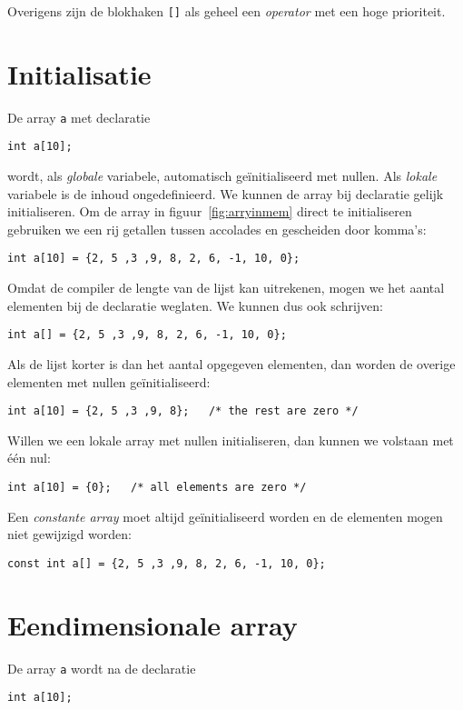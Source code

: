 Overigens zijn de blokhaken \texttt{[]} als geheel een \textsl{operator}\indexop{[]} met een hoge prioriteit.

\section{Initialisatie}
De array \texttt{a} met declaratie

\hspace*{1em}\texttt{int a[10];}

wordt, als \textsl{globale} variabele, automatisch geïnitialiseerd met nullen. Als \textsl{lokale} variabele is de inhoud ongedefinieerd.
We kunnen de array bij declaratie gelijk initialiseren. Om de array in figuur~\ref{fig:arryinmem} direct te initialiseren gebruiken we een rij getallen tussen accolades en gescheiden door komma's:

\hspace*{1em}\texttt{int a[10] = \{2, 5 ,3 ,9, 8, 2, 6, -1, 10, 0\};}

Omdat de compiler de lengte van de lijst kan uitrekenen, mogen we het aantal elementen bij de declaratie weglaten. We kunnen dus ook schrijven:

\hspace*{1em}\texttt{int a[] = \{2, 5 ,3 ,9, 8, 2, 6, -1, 10, 0\};}

Als de lijst korter is dan het aantal opgegeven elementen, dan worden de overige elementen met nullen geïnitialiseerd:

\hspace*{1em}\texttt{int a[10] = \{2, 5 ,3 ,9, 8\}; \ \ /* the rest are zero */} 

Willen we een lokale array met nullen initialiseren, dan kunnen we volstaan met één nul:

\hspace*{1em}\texttt{int a[10] = \{0\}; \ \ /* all elements are zero */} 

Een \textsl{constante array} moet altijd geïnitialiseerd worden en de elementen mogen niet gewijzigd worden:

\hspace*{1em}\texttt{const int a[] = \{2, 5 ,3 ,9, 8, 2, 6, -1, 10, 0\};}

\section{Eendimensionale array}
De array \texttt{a} wordt na de declaratie

\hspace*{1em}\texttt{int a[10];}

